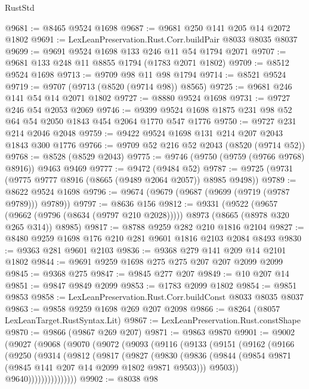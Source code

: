 \begin{lexlean}{RustStd}
\begin{coremodule}
@9681 := @8465 @9524 @1698
@9687 := @9681 @250 @141 @205 @14 @2072 @1802
@9691 := LexLeanPreservation.Rust.Corr.buildPair @8033 @8035 @8037
@9699 := @9691 @9524 @1698 @133 @246 @11 @54 @1794 @2071
@9707 := @9681 @133 @248 @11 @8855 @1794 (@1783 @2071 @1802)
@9709 := @8512 @9524 @1698
@9713 := @9709 @98 @11 @98 @1794
@9714 := @8521 @9524
@9719 := @9707 (@9713 (@8520 (@9714 @98)) @8565)
@9725 := @9681 @246 @141 @54 @14 @2071 @1802
@9727 := @8880 @9524 @1698
@9731 := @9727 @246 @54 @2053 @2069
@9746 := @9399 @9524 @1698 @1875 @231 @98 @52 @64 @54 @2050 @1843 @454 @2064 @1770 @547 @1776
@9750 := @9727 @231 @214 @2046 @2048
@9759 := @9422 @9524 @1698 @131 @214 @207 @2043 @1843 @300 @1776
@9766 := @9709 @52 @216 @52 @2043 (@8520 (@9714 @52))
@9768 := @8528 (@8529 @2043)
@9775 := @9746 (@9750 (@9759 (@9766 @9768) @8916)) @9463 @9469
@9777 := @9472 (@9484 @52)
@9787 := @9725 (@9731 (@9775 @9777 @8916 (@8665 (@9489 @2064 @2057)) @8985 @9498))
@9789 := @8622 @9524 @1698
@9796 := @9674 (@9679 (@9687 (@9699 (@9719 (@9787 @9789))) @9789))
@9797 := @8636 @156
@9812 := @9331
    (@9522
      (@9657 (@9662 (@9796 (@8634 (@9797 @210 @2028)))))
      @8973
      (@8665 (@8978 @320 @265 @314))
      @8985)
@9817 := @8788 @9259 @282 @210 @1816 @2104
@9827 := @8480 @9259 @1698 @176 @210 @281 @9601 @1816 @2103 @2084 @8493
@9830 := @9363 @281 @9601 @2103
@9836 := @9368 @279 @141 @209 @14 @2101 @1802
@9844 := @9691 @9259 @1698 @275 @275 @207 @207 @2099 @2099
@9845 := @9368 @275
@9847 := @9845 @277 @207
@9849 := @10 @207 @14
@9851 := @9847 @9849 @2099
@9853 := @1783 @2099 @1802
@9854 := @9851 @9853
@9858 := LexLeanPreservation.Rust.Corr.buildConst @8033 @8035 @8037
@9863 := @9858 @9259 @1698 @269 @207 @2098
@9866 := @8264 (@8057 LexLeanTarget.RustSyntax.Lit)
@9867 := LexLeanPreservation.Rust.constShape
@9870 := @9866 (@9867 @269 @207)
@9871 := @9863 @9870
@9901 := @9002
    (@9027
      (@9068
        (@9070
          (@9072
            (@9093
              (@9116
                (@9133
                  (@9151
                    (@9162
                      (@9166
                        (@9250
                          (@9314
                            (@9812
                              (@9817
                                (@9827
                                  (@9830
                                    (@9836
                                      (@9844
                                        (@9854 @9871 (@9845 @141 @207 @14 @2099 @1802 @9871 @9503)))
                                      @9503))
                                  @9640)))))))))))))))
@9902 := @8038 @98

\end{coremodule}
\end{lexlean}
